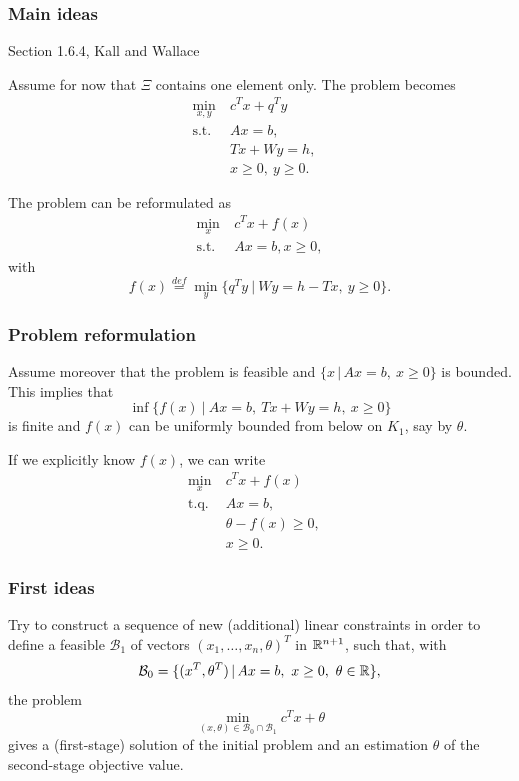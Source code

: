 \documentclass{beamer}
\begin{document}
\begin{frame}
\frametitle{Main ideas}

{\red Section 1.6.4, Kall and Wallace}

Assume for now that $\Xi$ contains one element only.
The problem becomes
\begin{align*}
\min_{x,y}\ & c^Tx + q^Ty & \\
\mbox{s.t. } & Ax = b, \\
& Tx + Wy = h, \\
& x \geq 0,\ y \geq 0.
\end{align*}

\mbox{}

The problem can be reformulated as
\begin{align*}
\min_x\ & c^Tx + f(x) \\
\mbox{s.t. } & Ax = b, x \geq 0,
\end{align*}
with
\[
f(x) \overset{def}{=} \min_y \lbrace q^Ty \ |\ Wy = h - Tx,\ y \geq 0 \rbrace.
\]

\end{frame}

\begin{frame}
\frametitle{Problem reformulation}

Assume moreover that the problem is feasible and $\lbrace x \,|\, Ax = b,\ x \geq 0 \rbrace$ is bounded. This implies that
\[
\inf \lbrace f(x) \ |\ Ax = b,\ Tx+Wy =h,\ x \geq 0 \rbrace
\]
is finite and $f(x)$ can be uniformly bounded from below on $K_1$, say by $\theta$.

\mbox{}

If we explicitly know $f(x)$, we can write
\begin{align*}
\min_x\ & c^Tx + f(x) & \\
\mbox{t.q. } & Ax = b, \\
& \theta - f(x) \geq 0, \\
& x \geq 0.
\end{align*}

\end{frame}

\begin{frame}
\frametitle{First ideas}

Try to construct a {\blue sequence of new (additional) linear constraints} in order to define a feasible $\mathcal{B}_1$ of vectors $(x_1,\ldots,x_n,\theta)^T$ in $\mathbb{R}^{n+1}$, such that, with
\[
\mathcal{B}_0 = \lbrace (x^T, \theta^T) \,|\, Ax = b,\ x \geq 0,\
\theta \in \mathbb{R} \rbrace,
\]
the problem
\[
\min_{(x,\theta) \in \mathcal{B}_0 \cap \mathcal{B}_1} c^Tx+\theta
\]
gives a (first-stage) solution of the initial problem and an estimation $\theta$ of the second-stage objective value.

\end{frame}
\end{document}
